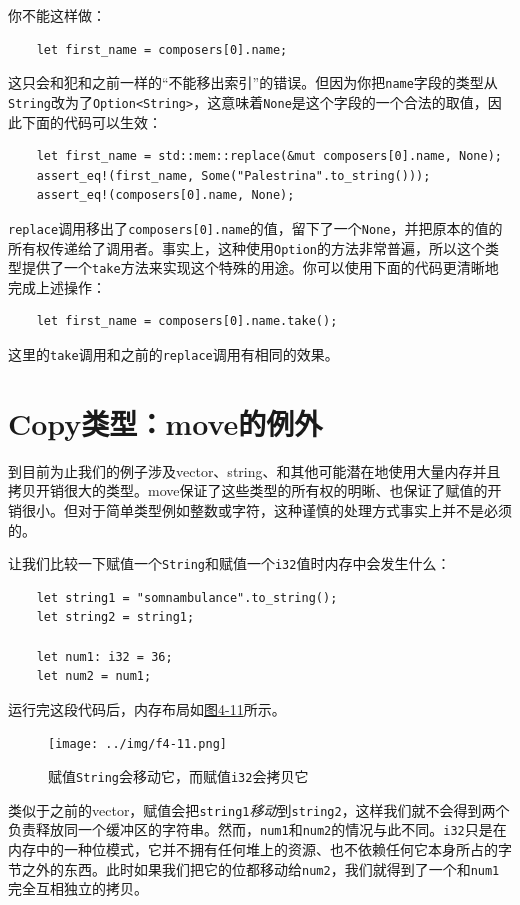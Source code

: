 你不能这样做：
\begin{verbatim}
    let first_name = composers[0].name;
\end{verbatim}

这只会和犯和之前一样的“不能移出索引”的错误。但因为你把\texttt{name}字段的类型从\texttt{String}改为了\texttt{Option<String>}，这意味着\texttt{None}是这个字段的一个合法的取值，因此下面的代码可以生效：
\begin{verbatim}
    let first_name = std::mem::replace(&mut composers[0].name, None);
    assert_eq!(first_name, Some("Palestrina".to_string()));
    assert_eq!(composers[0].name, None);
\end{verbatim}

\texttt{replace}调用移出了\texttt{composers[0].name}的值，留下了一个\texttt{None}，并把原本的值的所有权传递给了调用者。事实上，这种使用\texttt{Option}的方法非常普遍，所以这个类型提供了一个\texttt{take}方法来实现这个特殊的用途。你可以使用下面的代码更清晰地完成上述操作：
\begin{verbatim}
    let first_name = composers[0].name.take();
\end{verbatim}
这里的\texttt{take}调用和之前的\texttt{replace}调用有相同的效果。

\section{Copy类型：move的例外}\label{copy}
到目前为止我们的例子涉及vector、string、和其他可能潜在地使用大量内存并且拷贝开销很大的类型。move保证了这些类型的所有权的明晰、也保证了赋值的开销很小。但对于简单类型例如整数或字符，这种谨慎的处理方式事实上并不是必须的。

让我们比较一下赋值一个\texttt{String}和赋值一个\texttt{i32}值时内存中会发生什么：
\begin{verbatim}
    let string1 = "somnambulance".to_string();
    let string2 = string1;

    let num1: i32 = 36;
    let num2 = num1;
\end{verbatim}

运行完这段代码后，内存布局如\hyperref[f4-11]{图4-11}所示。
\begin{figure}[htbp]
    \centering
    \texttt{[image: ../img/f4-11.png]}
    \caption{赋值\texttt{String}会移动它，而赋值\texttt{i32}会拷贝它}
    \label{f4-11}
\end{figure}

类似于之前的vector，赋值会把\texttt{string1}\emph{移动}到\texttt{string2}，这样我们就不会得到两个负责释放同一个缓冲区的字符串。然而，\texttt{num1}和\texttt{num2}的情况与此不同。\texttt{i32}只是在内存中的一种位模式，它并不拥有任何堆上的资源、也不依赖任何它本身所占的字节之外的东西。此时如果我们把它的位都移动给\texttt{num2}，我们就得到了一个和\texttt{num1}完全互相独立的拷贝。

